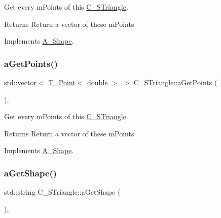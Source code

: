 Get every m\+Points of this \hyperlink{classC__STriangle}{C\+\_\+\+S\+Triangle}. 

\begin{DoxyReturn}{Returns}
Return a vector of these m\+Points 
\end{DoxyReturn}


Implements \hyperlink{classA__Shape_a9fd1285bd63b1fc88943c9969bf01a5c}{A\+\_\+\+Shape}.

\mbox{\label{classC__STriangle_a8d144f4451fe2e5bf6f333d8c37f0f57}} 
\subsubsection{\texorpdfstring{a\+Get\+Points()}{aGetPoints()}\hspace{0.1cm}{\footnotesize\ttfamily [2/2]}}
{\footnotesize\ttfamily std\+::vector$<$ \hyperlink{classT__Point}{T\+\_\+\+Point}$<$ double $>$ $>$ C\+\_\+\+S\+Triangle\+::a\+Get\+Points (\begin{DoxyParamCaption}{ }\end{DoxyParamCaption})\hspace{0.3cm}{\ttfamily [override]}, {\ttfamily [virtual]}}



Get every m\+Points of this \hyperlink{classC__STriangle}{C\+\_\+\+S\+Triangle}. 

\begin{DoxyReturn}{Returns}
Return a vector of these m\+Points 
\end{DoxyReturn}


Implements \hyperlink{classA__Shape_a9fd1285bd63b1fc88943c9969bf01a5c}{A\+\_\+\+Shape}.

\mbox{\label{classC__STriangle_a40c1434870b99112c4457819c9295483}} 
\subsubsection{\texorpdfstring{a\+Get\+Shape()}{aGetShape()}\hspace{0.1cm}{\footnotesize\ttfamily [1/2]}}
{\footnotesize\ttfamily std\+::string C\+\_\+\+S\+Triangle\+::a\+Get\+Shape (\begin{DoxyParamCaption}{ }\end{DoxyParamCaption})\hspace{0.3cm}{\ttfamily [override]}, {\ttfamily [virtual]}}



